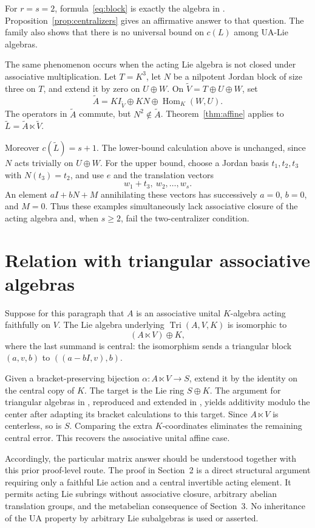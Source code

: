 \documentclass[11pt]{article}
\theoremstyle{definition}
\DeclareMathOperator{\Hom}{Hom}
\DeclareMathOperator{\Tri}{Tri}
\begin{document}
For $r=s=2$, formula~\eqref{eq:block} is exactly the algebra in \cite[Example~2, Problem~4, p.~184]{Arz}. Proposition~\ref{prop:centralizers} gives an affirmative answer to that question. The family also shows that there is no universal bound on $c(L)$ among UA-Lie algebras.

The same phenomenon occurs when the acting Lie algebra is not closed under associative multiplication. Let $T=K^3$, let $N$ be a nilpotent Jordan block of size three on $T$, and extend it by zero on $U\oplus W$. On $\widetilde V=T\oplus U\oplus W$, set
\[
 \widetilde A=K I_{\widetilde V}\oplus K N\oplus\Hom_K(W,U).
\]
The operators in $\widetilde A$ commute, but $N^2\notin\widetilde A$. Theorem~\ref{thm:affine} applies to $\widetilde L=\widetilde A\ltimes\widetilde V$.

Moreover $c(\widetilde L)=s+1$. The lower-bound calculation above is unchanged, since $N$ acts trivially on $U\oplus W$. For the upper bound, choose a Jordan basis $t_1,t_2,t_3$ with $N(t_3)=t_2$, and use $e$ and the translation vectors
\[
 w_1+t_3,\ w_2,\ldots,w_s.
\]
An element $aI+bN+M$ annihilating these vectors has successively $a=0$, $b=0$, and $M=0$. Thus these examples simultaneously lack associative closure of the acting algebra and, when $s\ge2$, fail the two-centralizer condition.

\section{Relation with triangular associative algebras}\label{sec:comparison}
Suppose for this paragraph that $A$ is an associative unital $K$-algebra acting faithfully on $V$. The Lie algebra underlying $\Tri(A,V,K)$ is isomorphic to
\[
 (A\ltimes V)\oplus K,
\]
where the last summand is central: the isomorphism sends a triangular block $(a,v,b)$ to $((a-bI,v),b)$.

Given a bracket-preserving bijection $\alpha:A\ltimes V\to S$, extend it by the identity on the central copy of $K$. The target is the Lie ring $S\oplus K$. The argument for triangular algebras in \cite{QH}, reproduced and extended in \cite{FG}, yields additivity modulo the center after adapting its bracket calculations to this target. Since $A\ltimes V$ is centerless, so is $S$. Comparing the extra $K$-coordinates eliminates the remaining central error. This recovers the associative unital affine case.

Accordingly, the particular matrix answer should be understood together with this prior proof-level route. The proof in Section~2 is a direct structural argument requiring only a faithful Lie action and a central invertible acting element. It permits acting Lie subrings without associative closure, arbitrary abelian translation groups, and the metabelian consequence of Section~3. No inheritance of the UA property by arbitrary Lie subalgebras is used or asserted.
\end{document}

